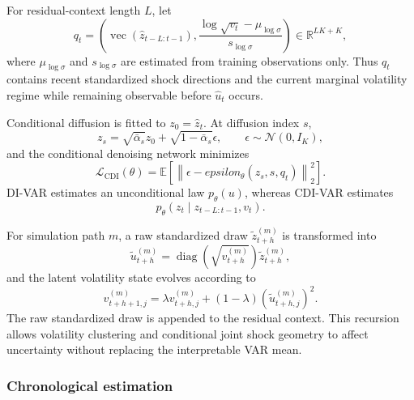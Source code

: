\documentclass[11pt]{article}
\newcommand{\R}{\mathbb{R}}
\begin{document}
For residual-context length $L$, let
\begin{equation}
    q_t=\left(
        \operatorname{vec}(\widehat z_{t-L:t-1}),
        \frac{\log\sqrt{v_t}-\mu_{\log \sigma}}
        {s_{\log \sigma}}
    \right)\in\R^{LK+K},
    \label{eq:cdi-context}
\end{equation}
where $\mu_{\log\sigma}$ and $s_{\log\sigma}$ are estimated from training observations only. Thus $q_t$ contains recent standardized shock directions and the current marginal volatility regime while remaining observable before $\widehat u_t$ occurs.

Conditional diffusion is fitted to $z_0=\widehat z_t$. At diffusion index $s$,
\begin{equation}
    z_s=\sqrt{\bar\alpha_s}z_0+
    \sqrt{1-\bar\alpha_s}\epsilon,
    \qquad \epsilon\sim\mathcal N(0,I_K),
\end{equation}
and the conditional denoising network minimizes
\begin{equation}
    \mathcal L_{\mathrm{CDI}}(\theta)
    =\mathbb E\left[
        \left\|\epsilon-epsilon_\theta(z_s,s,q_t)\right\|_2^2
    \right].
    \label{eq:cdi-loss}
\end{equation}
DI-VAR estimates an unconditional law $p_\theta(u)$, whereas CDI-VAR estimates
\begin{equation}
    p_\theta\!\left(z_t\mid z_{t-L:t-1},v_t\right).
\end{equation}

For simulation path $m$, a raw standardized draw $\widetilde z_{t+h}^{(m)}$ is transformed into
\begin{equation}
    \widetilde u_{t+h}^{(m)}
    =\operatorname{diag}\!\left(\sqrt{v_{t+h}^{(m)}}\right)
    \widetilde z_{t+h}^{(m)},
    \label{eq:cdi-unscale}
\end{equation}
and the latent volatility state evolves according to
\begin{equation}
    v_{t+h+1,j}^{(m)}
    =\lambda v_{t+h,j}^{(m)}
    +(1-\lambda)\left(\widetilde u_{t+h,j}^{(m)}\right)^2.
    \label{eq:cdi-state-update}
\end{equation}
The raw standardized draw is appended to the residual context. This recursion allows volatility clustering and conditional joint shock geometry to affect uncertainty without replacing the interpretable VAR mean.

\subsubsection{Chronological estimation}
\end{document}
